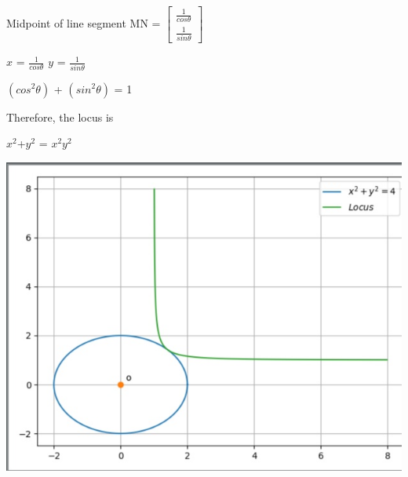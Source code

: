 \documentclass{beamer}
\begin{document}
\begin{frame}

Midpoint of line segment MN = $\begin{bmatrix}

\frac{1}{cos\theta}\\\frac{1}{sin\theta}
 \end{bmatrix}$
 
 \vspace{0.4cm}
 
 
\hspace{1.5cm} $x$ = $\frac{1}{cos\theta}$
          \hspace{1.5cm}$y$ = $\frac{1}{sin\theta}$
          
        \vspace{1cm}
 
 $(cos^2\theta)$ +  $(sin^2\theta)$ = 1
 
 \vspace{1cm}
Therefore, the locus is 


\hspace{4cm}
$x^2$+$y^2$ = $x^2$$y^2$
 
 
\end{frame}
\begin{frame}
\includegraphics[scale=0.5]{figure_1-3}
\end{frame}
\end{document}
